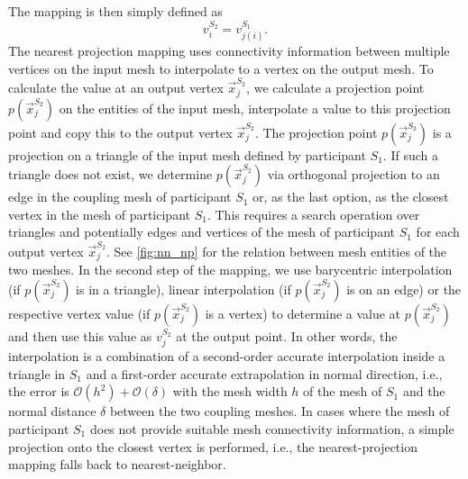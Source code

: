 The mapping is then simply defined as
\[ v_{i}^{S_2} = v_{j(i)}^{S_1}. \] 
The nearest projection mapping uses connectivity information between multiple vertices on the input mesh to interpolate to a vertex on the output mesh. To calculate the value at an output vertex $\vec{x}_j^{S_2}$, we calculate a projection point $p(\vec{x}_j^{S_2})$ on the entities of the input mesh, interpolate a value to this projection point and copy this to the output vertex $\vec{x}_j^{S_2}$. The projection point $p(\vec{x}_j^{S_2})$ is a projection on a triangle of the input mesh defined by participant ${S_1}$. If such a triangle does not exist, we determine $p(\vec{x}_j^{S_2})$ via orthogonal projection to an edge in the coupling mesh of participant ${S_1}$ or, as the last option, as the closest vertex in the mesh of participant ${S_1}$. This requires a search operation over triangles and potentially edges and vertices of the mesh of participant ${S_1}$ for each output vertex $\vec{x}_j^{S_2}$. See \autoref{fig:nn_np} for the relation between mesh entities of the two meshes. In the second step of the mapping, we use barycentric interpolation (if $p(\vec{x}_j^{S_2})$ is in a triangle), linear interpolation (if $p(\vec{x}_j^{S_2})$ is on an edge) or the respective vertex value (if $p(\vec{x}_j^{S_2})$ is a vertex) to determine a value at $p(\vec{x}_j^{S_2})$ and then use this value as $v_j^{S_2}$ at the output point. In other words, the interpolation is a combination of a second-order accurate interpolation inside a triangle in $S_1$ and a first-order accurate extrapolation in normal direction, i.e., the error is $\mathcal{O}(h^2) + \mathcal{O}(\delta)$ with the mesh width $h$ of the mesh of $S_1$ and the normal distance $\delta$ between the two coupling meshes.  
In cases where the mesh of participant ${S_1}$ does not provide suitable mesh connectivity information, a simple projection onto the closest vertex is performed, i.e., the nearest-projection mapping falls back to nearest-neighbor.

